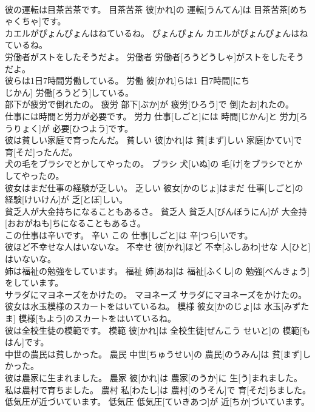 \documentclass[8pt]{extreport}
\begin{document}
\begin{CJK}{UTF8}{min}
\\	彼の運転は目茶苦茶です。	目茶苦茶	彼[かれ]の 運転[うんてん]は 目茶苦茶[めちゃくちゃ]です。	
\\	カエルがぴょんぴょんはねているね。	ぴょんぴょん	カエルがぴょんぴょんはねているね。	
\\	労働者がストをしたそうだよ。	労働者	労働者[ろうどうしゃ]がストをしたそうだよ。	
\\	彼らは1日7時間労働している。	労働	彼[かれ]らは1 日7時間[にち 
\\	じかん] 労働[ろうどう]している。	
\\	部下が疲労で倒れたの。	疲労	部下[ぶか]が 疲労[ひろう]で 倒[たお]れたの。	
\\	仕事には時間と労力が必要です。	労力	仕事[しごと]には 時間[じかん]と 労力[ろうりょく]が 必要[ひつよう]です。	
\\	彼は貧しい家庭で育ったんだ。	貧しい	彼[かれ]は 貧[まず]しい 家庭[かてい]で 育[そだ]ったんだ。	
\\	犬の毛をブラシでとかしてやったの。	ブラシ	犬[いぬ]の 毛[け]をブラシでとかしてやったの。	
\\	彼女はまだ仕事の経験が乏しい。	乏しい	彼女[かのじょ]はまだ 仕事[しごと]の 経験[けいけん]が 乏[とぼ]しい。	
\\	貧乏人が大金持ちになることもあるさ。	貧乏人	貧乏人[びんぼうにん]が 大金持[おおがねも]ちになることもあるさ。	
\\	この仕事は辛いです。	辛い	この 仕事[しごと]は 辛[つら]いです。	
\\	彼ほど不幸せな人はいないな。	不幸せ	彼[かれ]ほど 不幸[ふしあわ]せな 人[ひと]はいないな。	
\\	姉は福祉の勉強をしています。	福祉	姉[あね]は 福祉[ふくし]の 勉強[べんきょう]をしています。	
\\	サラダにマヨネーズをかけたの。	マヨネーズ	サラダにマヨネーズをかけたの。	
\\	彼女は水玉模様のスカートをはいているね。	模様	彼女[かのじょ]は 水玉[みずたま] 模様[もよう]のスカートをはいているね。	
\\	彼は全校生徒の模範です。	模範	彼[かれ]は 全校生徒[ぜんこう せいと]の 模範[もはん]です。	
\\	中世の農民は貧しかった。	農民	中世[ちゅうせい]の 農民[のうみん]は 貧[まず]しかった。	
\\	彼は農家に生まれました。	農家	彼[かれ]は 農家[のうか]に 生[う]まれました。	
\\	私は農村で育ちました。	農村	私[わたし]は 農村[のうそん]で 育[そだ]ちました。	
\\	低気圧が近づいています。	低気圧	低気圧[ていきあつ]が 近[ちか]づいています。	

\end{CJK}
\end{document}
